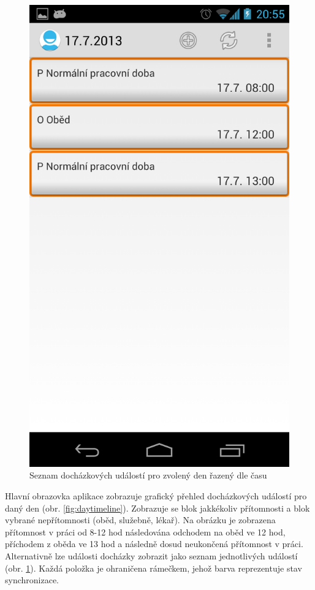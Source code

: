 \documentclass{diplomka}
\begin{document}
\begin{figure}[H]
\begin{minipage}{.45\textwidth}
  \includegraphics[width=.9\linewidth]{scr/daytimelinealt.png}
  \caption{Seznam docházkových událostí pro zvolený den řazený dle času}
  \label{fig:daytimelinealt}
\end{minipage}
\end{figure}
Hlavní obrazovka aplikace zobrazuje grafický přehled docházkových událostí pro daný den (obr. \ref{fig:daytimeline}). Zobrazuje se blok jakkékoliv přítomnosti a blok vybrané nepřítomnosti (oběd, služebně, lékař). Na obrázku je zobrazena přítomnost v práci od 8-12 hod následována odchodem na oběd ve 12 hod, příchodem z oběda ve 13 hod a následně dosud neukončená přítomnost v práci. Alternativně lze události docházky zobrazit jako seznam jednotlivých událostí (obr. \ref{fig:daytimelinealt}). Každá položka je ohraničena rámečkem, jehož barva reprezentuje stav synchronizace.\newpage
\end{document}
